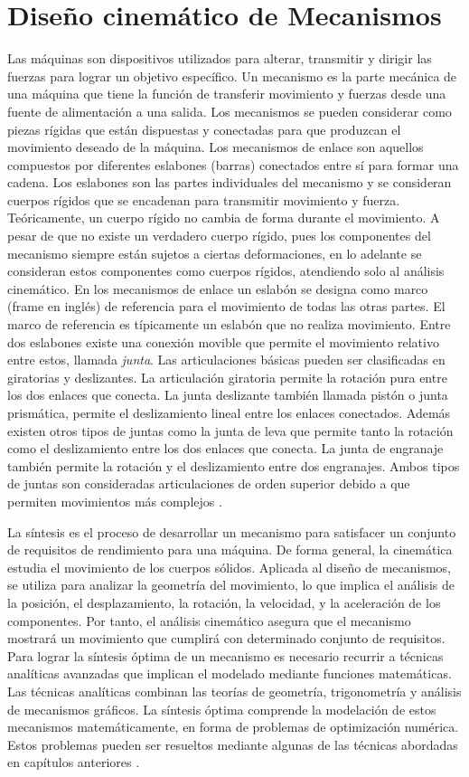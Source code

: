 \section{Diseño cinemático de Mecanismos}
Las máquinas son dispositivos utilizados para alterar, transmitir y dirigir las fuerzas para lograr un objetivo específico. Un mecanismo es la parte mecánica de una máquina que tiene la función de transferir movimiento y fuerzas desde una fuente de alimentación a una salida. Los mecanismos se pueden considerar como piezas rígidas que están dispuestas y conectadas para que produzcan el movimiento deseado de la máquina. Los mecanismos de enlace son aquellos compuestos por diferentes eslabones (barras) conectados entre sí para formar una cadena. Los eslabones son las partes individuales del mecanismo y se consideran cuerpos rígidos que se encadenan  para transmitir movimiento y fuerza. Teóricamente, un cuerpo rígido no cambia de forma durante el movimiento. A pesar de que no existe un verdadero cuerpo rígido, pues los componentes del mecanismo siempre están sujetos a ciertas deformaciones, en lo adelante se consideran estos componentes como cuerpos rígidos, atendiendo solo al análisis cinemático. En los mecanismos de enlace un eslabón se designa como marco (frame en inglés) de referencia para el movimiento de todas las otras partes. El marco de referencia es típicamente un eslabón que no realiza movimiento. Entre dos eslabones existe una conexión movible que permite el movimiento relativo entre estos, llamada \textit{junta}. Las articulaciones básicas pueden ser clasificadas en giratorias y deslizantes. La articulación giratoria permite la rotación pura entre los dos enlaces que conecta. La junta deslizante también llamada pistón o junta prismática, permite el deslizamiento lineal entre los enlaces conectados. Además existen otros tipos de juntas como la junta de leva que permite tanto la rotación como el deslizamiento entre los dos enlaces que conecta. La junta de engranaje también permite la rotación y el deslizamiento entre dos engranajes. Ambos tipos de juntas son consideradas articulaciones de orden superior debido a que permiten movimientos más complejos \cite{myszka2004machines}.

La síntesis es el proceso de desarrollar un mecanismo para satisfacer un conjunto de requisitos de rendimiento para una máquina. De forma general, la cinemática estudia el movimiento de los cuerpos sólidos. Aplicada al diseño de mecanismos, se utiliza para analizar la geometría del movimiento, lo que implica el análisis de la posición, el desplazamiento, la rotación, la velocidad, y la aceleración de los componentes. Por tanto, el análisis cinemático asegura que el mecanismo mostrará un movimiento que cumplirá con determinado conjunto de requisitos. Para lograr la síntesis óptima de un mecanismo es necesario recurrir a técnicas analíticas avanzadas que implican el modelado mediante funciones matemáticas. Las técnicas analíticas combinan las teorías de geometría, trigonometría y análisis de mecanismos gráficos. La síntesis óptima comprende la modelación de estos mecanismos matemáticamente, en forma de problemas de optimización numérica. Estos problemas pueden ser resueltos mediante algunas de las técnicas abordadas en capítulos anteriores \cite{myszka2004machines}. 


